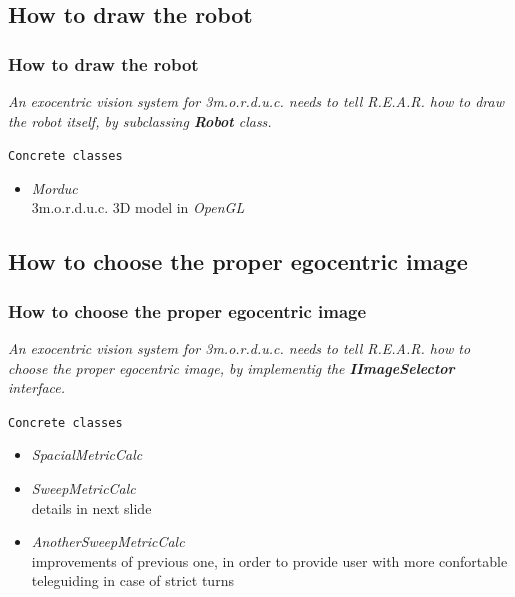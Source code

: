 \subsection{How to draw the robot}
\frame
{
  \frametitle{How to draw the robot}
  
  \emph{An exocentric vision system for \textit{3m.o.r.d.u.c.} 
    needs to tell \textit{R.E.A.R.} how to draw the robot itself,
    by subclassing \textbf{Robot} class.}
  \pause

  \vskip15pt

  \begin{block} {\alert{\texttt{Concrete classes}}}

    \pause
    \begin{itemize}
      
    \item \alert{\textit{Morduc}} \\
      3m.o.r.d.u.c. 3D model in \textit{OpenGL}
    \end{itemize}

  \end{block}
}

\subsection{How to choose the proper egocentric image}
\frame
{
  \frametitle{How to choose the proper egocentric image}
  
  \emph{An exocentric vision system for \textit{3m.o.r.d.u.c.} 
    needs to tell \textit{R.E.A.R.} how to choose the proper egocentric image,
    by implementig the \textbf{IImageSelector} interface.}
  \pause

  \vskip15pt

  \begin{block} {\alert{\texttt{Concrete classes}}}

    \begin{itemize}
      
    \pause
    \item \alert{\textit{SpacialMetricCalc}}
    \pause
    \item \alert{\textit{SweepMetricCalc}} \\
      details in next slide
    \pause
    \item \alert{\textit{AnotherSweepMetricCalc}} \\
      improvements of previous one, in order to
      provide user with more confortable teleguiding
      in case of strict turns

    \end{itemize}

  \end{block}
}

